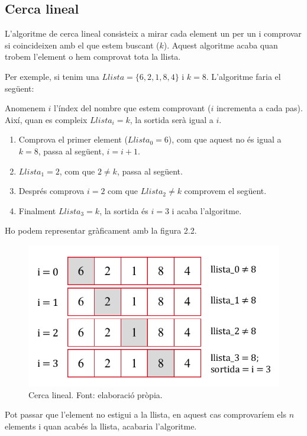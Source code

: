 \subsection{Cerca lineal}
L'algoritme de cerca lineal consisteix a mirar cada element un per un i comprovar si coincideixen amb el que estem buscant ($k$). Aquest algoritme acaba quan trobem l'element o hem comprovat tota la llista.

Per exemple, si tenim una $Llista = \lbrace 6, 2, 1, 8, 4 \rbrace$ i $k = 8$. L'algoritme faria el següent:

Anomenem $i$ l'índex del nombre que estem comprovant ($i$ incrementa a cada pas). Així, quan es compleix $Llista_i = k$, la sortida serà igual a $i$.

\begin{enumerate}
    \item Comprova el primer element ($Llista_0 = 6$), com que aquest no és igual a $k = 8$, passa al següent, $i = i + 1$.
    \item $Llista_1 = 2$, com que $2 \neq k$, passa al següent.
    \item Després comprova $i = 2$ com que $Llista_2 \neq k$ comprovem el següent.
    \item Finalment $Llista_3 = k$, la sortida és $i = 3$ i acaba l'algoritme.
\end{enumerate}

Ho podem representar gràficament amb la figura 2.2.
\begin{figure}[h]
    \centering
    \includegraphics[width=.45\textwidth]{capitols/figures/linearsearch (2).pdf}
    \caption[Cerca lineal.]{Cerca lineal. Font: elaboració pròpia.}
    \label{fig:my_label}
\end{figure}

Pot passar que l'element no estigui a la llista, en aquest cas comprovaríem els $n$ elements i quan acabés la llista, acabaria l'algoritme.

